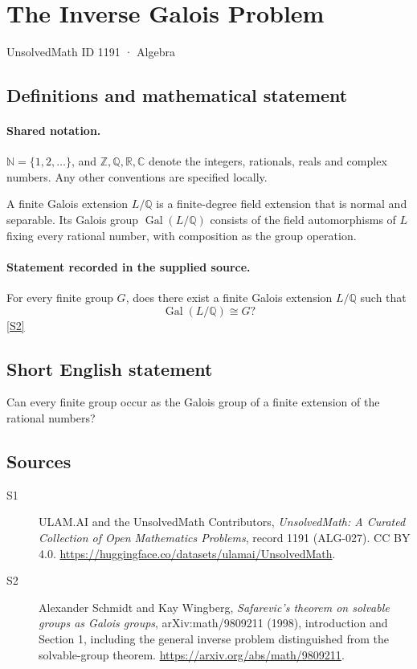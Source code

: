 \documentclass[11pt]{article}
\newcommand{\sref}[2]{\hyperlink{source:#1:#2}{[S#2]}}
\begin{document}
\setcounter{section}{1190}
\section{The Inverse Galois Problem}\label{1191}
{\small\sffamily UnsolvedMath ID 1191 · Algebra}
\subsection{Definitions and mathematical statement}

\paragraph{Shared notation.}$\mathbb N=\{1,2,\ldots\}$, and $\mathbb Z,\mathbb Q,\mathbb R,\mathbb C$ denote the integers, rationals, reals and complex numbers. Any other conventions are specified locally.


A finite Galois extension \(L/\mathbb Q\) is a finite-degree field
extension that is normal and separable.  Its Galois group
\(\operatorname{Gal}(L/\mathbb Q)\) consists of the field automorphisms
of \(L\) fixing every rational number, with composition as the group
operation.
\paragraph{Statement recorded in the supplied source.}
For every finite group \(G\), does there exist a finite Galois
extension \(L/\mathbb Q\) such that
\[
 \operatorname{Gal}(L/\mathbb Q)\cong G?
\] \sref{1191}{2}
\subsection{Short English statement}
Can every finite group occur as the Galois group of a finite extension of the rational numbers?
\subsection{Sources}
\begin{description}
\item[\hypertarget{source:1191:1}{S1}] ULAM.AI and the UnsolvedMath Contributors, \emph{UnsolvedMath: A Curated Collection of Open Mathematics Problems}, record 1191 (ALG-027). CC BY 4.0. \url{https://huggingface.co/datasets/ulamai/UnsolvedMath}.
\item[\hypertarget{source:1191:2}{S2}] Alexander Schmidt and Kay Wingberg, \emph{Safarevic's theorem on solvable groups as Galois groups}, arXiv:math/9809211 (1998), introduction and Section 1, including the general inverse problem distinguished from the solvable-group theorem. \url{https://arxiv.org/abs/math/9809211}.
\end{description}
\label{end:1191}
\end{document}
